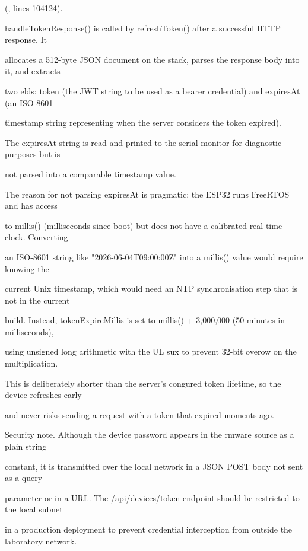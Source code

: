 (, lines 104124).

handleTokenResponse() is called by refreshToken() after a successful HTTP response. It

allocates a 512-byte JSON document on the stack, parses the response body into it, and extracts

two elds: token (the JWT string to be used as a bearer credential) and expiresAt (an ISO-8601

timestamp string representing when the server considers the token expired).

The expiresAt string is read and printed to the serial monitor for diagnostic purposes but is

not parsed into a comparable timestamp value.

The reason for not parsing expiresAt is pragmatic: the ESP32 runs FreeRTOS and has access

to millis() (milliseconds since boot) but does not have a calibrated real-time clock. Converting

an ISO-8601 string like "2026-06-04T09:00:00Z" into a millis() value would require knowing the

current Unix timestamp, which would need an NTP synchronisation step that is not in the current

build. Instead, tokenExpireMillis is set to millis() + 3,000,000 (50 minutes in milliseconds),

using unsigned long arithmetic with the UL sux to prevent 32-bit overow on the multiplication.

This is deliberately shorter than the server's congured token lifetime, so the device refreshes early

and never risks sending a request with a token that expired moments ago.

Security note. Although the device password appears in the rmware source as a plain string

constant, it is transmitted over the local network in a JSON POST body  not sent as a query

parameter or in a URL. The /api/devices/token endpoint should be restricted to the local subnet

in a production deployment to prevent credential interception from outside the laboratory network.

